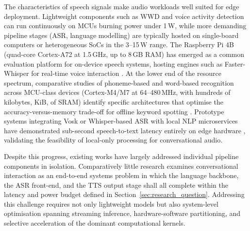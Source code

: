 \documentclass[manuscript,]{acmart} %
\begin{document}
The characteristics of speech signals make audio workloads well suited for edge
deployment. Lightweight components such as WWD and voice activity
detection can run continuously on MCUs burning power under 1\,W, while more
demanding pipeline stages (ASR, language modelling) are typically hosted on
single-board computers or heterogeneous SoCs in the 3--15\,W range.
The Raspberry Pi 4B (quad-core Cortex-A72 at 1.5\,GHz, up to 8\,GB RAM) has
emerged as a common evaluation platform for on-device speech systems, hosting
engines such as Faster-Whisper for real-time voice interaction
\cite{10.1145/3776942.3776981}.
At the lower end of the resource spectrum, comparative studies of phoneme-based
and word-based recognition across MCU-class devices (Cortex-M4/M7
at 64--480\,MHz, with hundreds of kilobytes, KiB, of SRAM) identify specific architectures
that optimise the accuracy-versus-memory trade-off for offline keyword spotting
\cite{10711025}.
Prototype systems integrating Vosk or Whisper-based ASR with local NLP
microservices have demonstrated sub-second speech-to-text latency entirely on edge
hardware \cite{info16080685}, validating the feasibility of local-only processing
for conversational audio.

Despite this progress, existing works have largely addressed individual pipeline
components in isolation. Comparatively little research examines conversational
interaction as an end-to-end systems problem in which the language backbone, the
ASR front-end, and the TTS output stage shall all complete within the latency and
power budget defined in Section~\ref{sec:research_question}.
Addressing this challenge requires not only lightweight models but also
system-level optimisation spanning streaming inference, hardware-software
partitioning, and selective acceleration of the dominant computational kernels.
\end{document}
